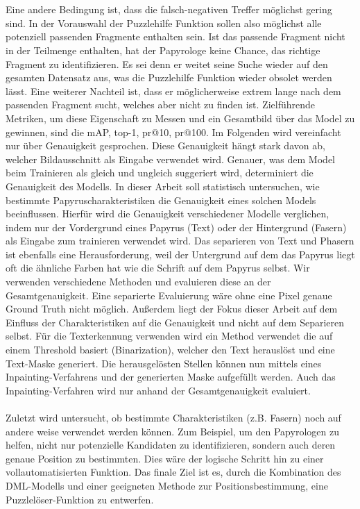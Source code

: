 \documentclass[12pt,a4paper]{article}
\begin{document}
\\\\
Eine andere Bedingung ist, dass die falsch-negativen Treffer möglichst gering sind. In der Vorauswahl der Puzzlehilfe Funktion sollen also möglichst alle potenziell passenden Fragmente enthalten sein. Ist das passende Fragment nicht in der Teilmenge enthalten, hat der Papyrologe keine Chance, das richtige Fragment zu identifizieren. Es sei denn er weitet seine Suche wieder auf den gesamten Datensatz aus, was die Puzzlehilfe Funktion wieder obsolet werden lässt. 
Eine weiterer Nachteil ist, dass er möglicherweise extrem lange nach dem passenden Fragment sucht, welches aber nicht zu finden ist. 
Zielführende Metriken, um diese Eigenschaft zu Messen und ein Gesamtbild über das Model zu gewinnen, sind die mAP, top-1, pr@10, pr@100. Im Folgenden wird vereinfacht nur über Genauigkeit gesprochen. Diese Genauigkeit hängt stark davon ab, welcher Bildausschnitt als Eingabe verwendet wird. Genauer, was dem Model beim Trainieren als gleich und ungleich suggeriert wird, determiniert die Genauigkeit des Modells. 
In dieser Arbeit soll statistisch untersuchen, wie bestimmte Papyruscharakteristiken die Genauigkeit eines solchen Models beeinflussen. Hierfür wird die Genauigkeit verschiedener Modelle verglichen, indem nur der Vordergrund eines Papyrus (Text) oder der Hintergrund (Fasern) als Eingabe zum trainieren verwendet wird. Das separieren von Text und Phasern ist ebenfalls eine Herausforderung, weil der Untergrund auf dem das Papyrus liegt oft die ähnliche Farben hat wie die Schrift auf dem Papyrus selbst. 
Wir verwenden verschiedene Methoden und evaluieren diese an der Gesamtgenauigkeit. Eine separierte Evaluierung wäre ohne eine Pixel genaue Ground Truth nicht möglich. Außerdem liegt der Fokus dieser Arbeit auf dem Einfluss der Charakteristiken auf die Genauigkeit und nicht auf dem Separieren selbst. Für die Texterkennung verwenden wird ein Method verwendet die auf einem Threshold basiert (Binarization), welcher den Text herauslöst und eine Text-Maske generiert. Die herausgelösten Stellen können nun mittels eines Inpainting-Verfahrens und der generierten Maske aufgefüllt werden. Auch das Inpainting-Verfahren wird nur anhand der Gesamtgenauigkeit evaluiert.
\\\\
Zuletzt wird untersucht, ob bestimmte Charakteristiken (z.B. Fasern) noch auf andere weise verwendet werden können. Zum Beispiel, um den Papyrologen zu helfen, nicht nur potenzielle Kandidaten zu identifizieren, sondern auch deren genaue Position zu bestimmten. Dies wäre der logische Schritt hin zu einer vollautomatisierten Funktion. Das finale Ziel ist es, durch die Kombination des DML-Modells und einer geeigneten Methode zur Positionsbestimmung, eine Puzzlelöser-Funktion zu entwerfen.
\end{document}
